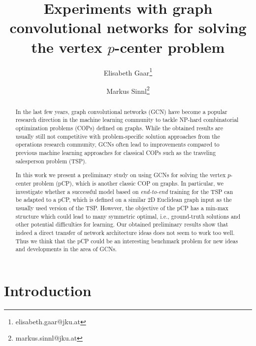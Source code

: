 \documentclass[]{article}
\newcommand{\PCP}{pCP\xspace}
\begin{document}
\title{Experiments with graph convolutional networks for solving the vertex $p$-center problem}

\author[1]{Elisabeth Gaar\thanks{elisabeth.gaar@jku.at}}


\author[1,2]{Markus Sinnl\thanks{markus.sinnl@jku.at}}



\date{}

\maketitle

\begin{abstract}
	
In the last few years, graph convolutional networks (GCN) have become a popular 
research direction in the machine learning community to tackle NP-hard 
combinatorial optimization problems (COPs) defined on graphs. While the 
obtained results are usually still not competitive with problem-specific 
solution approaches from the operations research community, GCNs often lead to 
improvements compared to previous machine learning approaches for classical 
COPs such as the traveling salesperson problem (TSP). 

In this work we present a preliminary study on using GCNs for solving the 
vertex $p$-center problem (\PCP), which is another classic COP on graphs. In 
particular, we investigate whether a successful model based on 
\emph{end-to-end} 
training for the TSP can be adapted to a \PCP, which is defined on a 
similar 2D Euclidean graph input as the usually used version of the TSP. 
However, the 
objective of the \PCP has a min-max structure which could lead to many 
symmetric optimal, i.e., ground-truth solutions and other potential 
difficulties for learning. Our obtained preliminary results show that indeed a 
direct transfer of network architecture ideas does not seem to work too well. 
Thus we think that the \PCP could be an interesting benchmark problem for new 
ideas and developments in the area of GCNs.
\end{abstract}

\section{Introduction}
\end{document}
